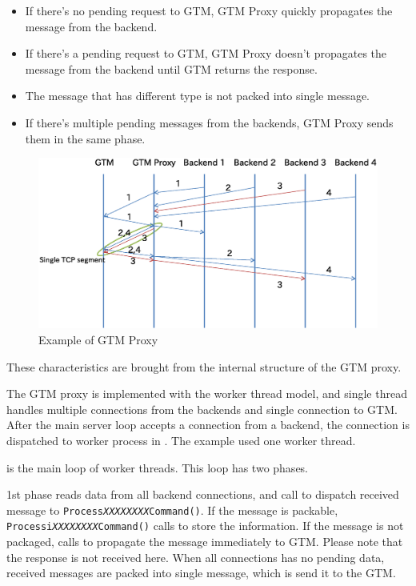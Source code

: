   \begin{itemize}
    \item If there's no pending request to GTM, GTM Proxy quickly propagates the message from
		  the backend.
    \item If there's a pending request to GTM, GTM Proxy doesn't propagates the message from
		  the backend until GTM returns the response.
    \item The message that has different type is not packed into single message.
    \item If there's multiple pending messages from the backends, GTM Proxy sends them in the same phase.
  \end{itemize}
  
  \begin{figure}[htp]
	  \begin{center}
		  \includegraphics[width=0.9\hsize]{txn_gtmpxy.eps}
		  \caption{\label{fig:txngtmpxy}Example of GTM Proxy}
	  \end{center}
  \end{figure}
  
  These characteristics are brought from the internal structure of the GTM proxy.
  
  The GTM proxy is implemented with the worker thread model, and single thread handles multiple
  connections from the backends and single connection to GTM.
  After the main server loop  accepts a connection
  from a backend, the connection is dispatched to worker process in
  .
  The example used one worker thread.
  
   is the main loop of worker threads.
  This loop has two phases.

  1st phase reads data from all backend connections, and call  to dispatch
  received message to \texttt{Process\textit{XXXXXXXX}Command()}.
  If the message is packable, \texttt{Processi\textit{XXXXXXXX}Command()} calls
   to store the information.
  If the message is not packaged, {\tt } calls  to propagate the
  message immediately to GTM.
  Please note that the response is not received here.
  When all connections has no pending data, received messages are packed into single message,
  which is send it to the GTM.
  
